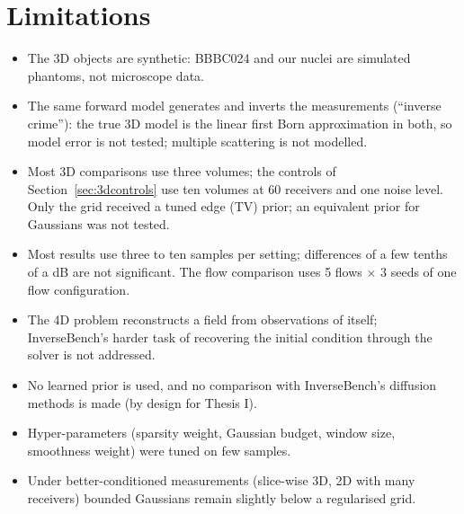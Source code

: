 \section{Limitations}
\begin{itemize}
  \item The 3D objects are synthetic: BBBC024 and our nuclei are simulated phantoms, not microscope data.
  \item The same forward model generates and inverts the measurements (``inverse crime''): the true 3D model is the
  linear first Born approximation in both, so model error is not tested; multiple scattering is not modelled.
  \item Most 3D comparisons use three volumes; the controls of Section~\ref{sec:3dcontrols} use ten volumes at 60
  receivers and one noise level. Only the grid received a tuned edge (TV) prior; an equivalent prior for Gaussians was
  not tested.
  \item Most results use three to ten samples per setting; differences of a few tenths of a dB are not significant.
  The flow comparison uses 5 flows $\times$ 3 seeds of one flow configuration.
  \item The 4D problem reconstructs a field from observations of itself; InverseBench's harder task of recovering the
  initial condition through the solver is not addressed.
  \item No learned prior is used, and no comparison with InverseBench's diffusion methods is made (by design for
  Thesis I).
  \item Hyper-parameters (sparsity weight, Gaussian budget, window size, smoothness weight) were tuned on few samples.
  \item Under better-conditioned measurements (slice-wise 3D, 2D with many receivers) bounded Gaussians remain
  slightly below a regularised grid.
\end{itemize}

